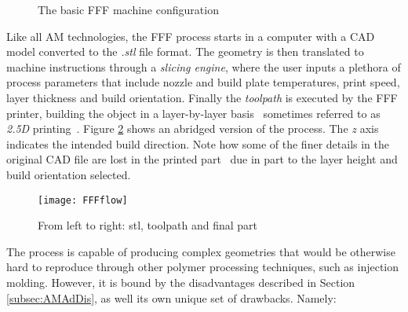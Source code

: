 \documentclass[main.tex]{subfiles}
\begin{document}
\begin{figure}[h]
	\center
	\hfill
	\caption{The basic FFF machine configuration} \label{fig:machconfig}
\end{figure}
Like all AM technologies, the FFF process starts in a computer with a CAD model converted to the \emph{.stl} file format. The geometry is then translated to machine instructions through a \emph{slicing engine}, where the user inputs a plethora of process parameters that include nozzle and build plate temperatures, print speed, layer thickness and build orientation. Finally the \emph{toolpath} is executed by the FFF printer, building the object in a layer-by-layer basis \textendash~sometimes referred to as \emph{2.5D} printing~\cite{Gibson2015, VanHulle2017}. Figure \ref{fig:FFFflow} shows an abridged version of the process. The \emph{z} axis indicates the intended build direction. Note how some of the finer details in the original CAD file are lost in the printed part \textendash~due in part to the layer height and build orientation selected.

\pagebreak
\begin{figure}[h]
	\center
	\texttt{[image: FFFflow]}
	\caption{From left to right: stl, toolpath and final part} \label{fig:FFFflow}
\end{figure}

The process is capable of producing complex geometries that would be otherwise hard to reproduce through other polymer processing techniques, such as injection molding. However, it is bound by the disadvantages described in Section \ref{subsec:AMAdDis}, as well its own unique set of drawbacks. Namely:
\end{document}
